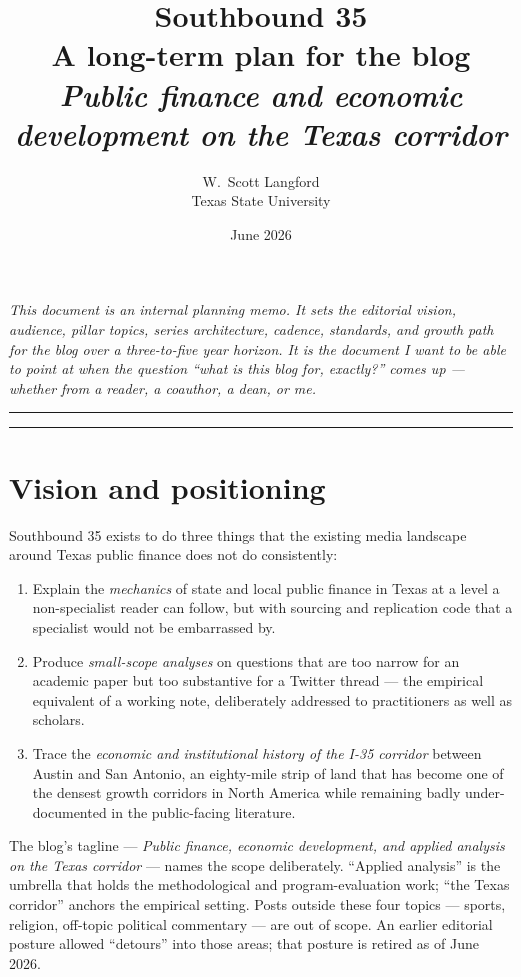 \documentclass[11pt]{article}
\title{\vspace{-1em}\textbf{Southbound 35}\\
\large A long-term plan for the blog\\[0.3em]
\normalsize \textit{Public finance and economic development on the Texas corridor}}
\author{W.\ Scott Langford\\Texas State University}
\date{June 2026}
\begin{document}
\maketitle
\thispagestyle{empty}

\vspace{-1.5em}
\noindent\textit{This document is an internal planning memo. It sets
the editorial vision, audience, pillar topics, series architecture,
cadence, standards, and growth path for the blog over a three-to-five
year horizon. It is the document I want to be able to point at when
the question ``what is this blog for, exactly?'' comes up --- whether
from a reader, a coauthor, a dean, or me.}

\vspace{1em}
\hrule
\tableofcontents
\hrule

\section{Vision and positioning}

Southbound 35 exists to do three things that the existing media
landscape around Texas public finance does not do consistently:

\begin{enumerate}[label=\textbf{(\arabic*)}]
\item Explain the \emph{mechanics} of state and local public finance
in Texas at a level a non-specialist reader can follow, but with
sourcing and replication code that a specialist would not be
embarrassed by.

\item Produce \emph{small-scope analyses} on questions that are too
narrow for an academic paper but too substantive for a Twitter
thread --- the empirical equivalent of a working note, deliberately
addressed to practitioners as well as scholars.

\item Trace the \emph{economic and institutional history of the
I-35 corridor} between Austin and San Antonio, an eighty-mile
strip of land that has become one of the densest growth corridors
in North America while remaining badly under-documented in the
public-facing literature.
\end{enumerate}

The blog's tagline --- \textit{Public finance, economic
development, and applied analysis on the Texas corridor} ---
names the scope deliberately. ``Applied analysis'' is the
umbrella that holds the methodological and program-evaluation
work; ``the Texas corridor'' anchors the empirical setting.
Posts outside these four topics --- sports, religion, off-topic
political commentary --- are out of scope. An earlier editorial
posture allowed ``detours'' into those areas; that posture is
retired as of June 2026.
\end{document}
